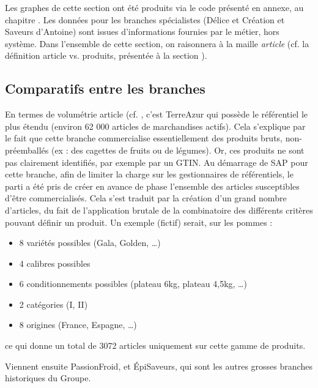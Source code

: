         Les graphes de cette section ont été produits via le code présenté en annexe, au chapitre .
        Les données pour les branches spécialistes (Délice et Création et Saveurs d'Antoine) sont issues d'informations fournies par le métier, hors système.
        Dans l'ensemble de cette section, on raisonnera à la maille \emph{article} (cf. la définition article vs. produits, présentée à la section ).

            \subsection{Comparatifs entre les branches}

                En termes de volumétrie article (cf. , c'est TerreAzur qui possède le référentiel le plus étendu (environ 62 000 articles de marchandises actifs).
                Cela s'explique par le fait que cette branche commercialise essentiellement des produits bruts, non-préemballés (ex : des cagettes de fruits ou de légumes).
                Or, ces produits ne sont pas clairement identifiés, par exemple par un GTIN.
                Au démarrage de SAP pour cette branche, afin de limiter la charge sur les gestionnaires de référentiels, le parti a été pris de créer en avance de phase l'ensemble des articles susceptibles d'être commercialisés.
                Cela s'est traduit par la création d'un grand nombre d'articles, du fait de l'application \og brutale \fg de la combinatoire des différents critères pouvant définir un produit.
                Un exemple (fictif) serait, sur les pommes : 
                \begin{itemize}
                    \item 8 variétés possibles (Gala, Golden, \dots)
                    \item 4 calibres possibles
                    \item 6 conditionnements possibles (plateau 6kg, plateau 4,5kg, \dots)
                    \item 2 catégories (I, II)
                    \item 8 origines (France, Espagne, \dots)
                \end{itemize}
                ce qui donne un total de 3072 articles uniquement sur cette gamme de produits.

                Viennent ensuite PassionFroid, et \'{E}piSaveurs, qui sont les autres \og grosses \fg branches historiques du Groupe.


